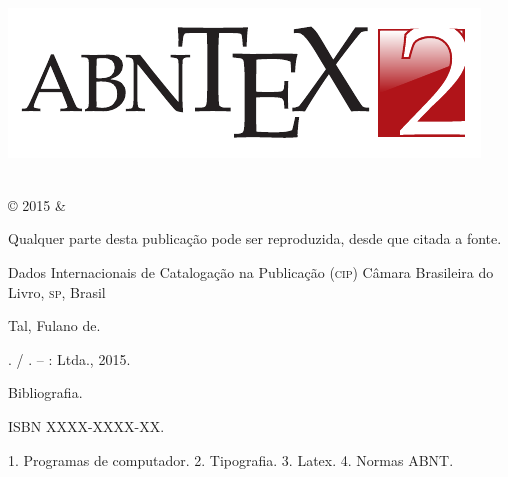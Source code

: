 \documentclass[
	10pt,				%
	openright,			%
	twoside,			%
	a5paper,			%
	english,			%
	french,				%
	spanish,			%
	brazil,				%
	sumario=tradicional
]{abntex2}
\begin{document}
\begin{titlingpage}

\phantom{xxx}
\vspace{0.5cm}
\huge
\raggedright
\imprimirautor\\
\vspace{2.5cm}
\huge 
{\raggedleft
\includegraphics[scale=0.9]{abntex2-modelo-img-marca.pdf}\\[1cm]
\textit{\textcolor{blue}{\imprimirtitulo}}\\[1cm]
}
\centering 
\vfill
\Large
\imprimirinstituicao

\clearpage
\ABNTEXfontereduzida
© 2015 \imprimirautor \space \& \imprimirinstituicao

Qualquer parte desta publicação pode ser reproduzida, desde que citada a fonte.

\vspace*{\fill}

\begin{center}
Dados Internacionais de Catalogação na Publicação (\textsc{cip})
Câmara Brasileira do Livro, \textsc{sp}, Brasil
\end{center}

\begin{mdframed}
\noindent Tal, Fulano de.

\imprimirtitulo. / \imprimirautor. -- \imprimirlocal: \imprimirinstituicao
Ltda., 2015.

\medskip

Bibliografia.

ISBN XXXX-XXXX-XX.

\medskip

1. Programas de computador. 2. Tipografia. 3. Latex. 4. Normas ABNT.

\end{mdframed}

\end{titlingpage}
\end{document}
